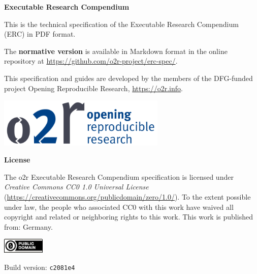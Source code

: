 \begin{titlepage}
    {\raggedleft
        \textbf{\Large Executable Research Compendium}\\
    }
    \vspace{\fill}
	
    This is the technical specification of the Executable Research Compendium (ERC) in PDF format.

    The \textbf{normative version} is available in Markdown format in the online repository at \url{https://github.com/o2r-project/erc-spec/}.

    This specification and guides are developed by the members of the DFG-funded project Opening Reproducible Research, \url{https://o2r.info}.

    \vspace{1cm}
    \begin{center}
        \includegraphics[width=8cm]{docs/img/o2r-logo}
    \end{center}
    \vspace{3cm}

    \textbf{License}

    The o2r Executable Research Compendium specification is licensed under \emph{Creative Commons CC0 1.0 Universal License} (\url{https://creativecommons.org/publicdomain/zero/1.0/}).
    To the extent possible under law, the people who associated CC0 with this work have waived all copyright and related or neighboring rights to this work.
    This work is published from: Germany.

    \includegraphics[width=2cm]{docs/cc-zero}

    Build version: \texttt{c2081e4}
 
\end{titlepage}
